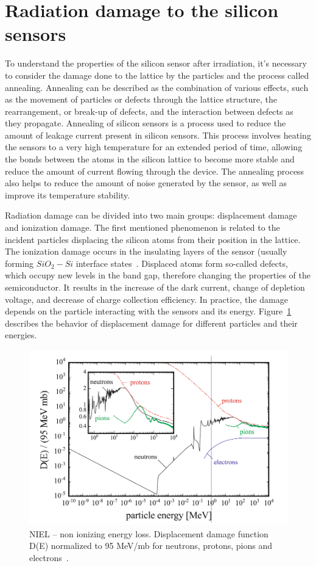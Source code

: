 \section{Radiation damage to the silicon sensors}
\label{silicon_damage}
To understand the properties of the silicon sensor after irradiation, it's necessary to consider the damage done to the lattice by the particles and the process called annealing. Annealing can be described as the combination of various effects, such as the movement of particles or defects through the lattice structure, the rearrangement, or break-up of defects, and the interaction between defects as they propagate. Annealing of silicon sensors is a process used to reduce the amount of leakage current present in silicon sensors. This process involves heating the sensors to a very high temperature for an extended period of time, allowing the bonds between the atoms in the silicon lattice to become more stable and reduce the amount of current flowing through the device. The annealing process also helps to reduce the amount of noise generated by the sensor, as well as improve its temperature stability. 

Radiation damage can be divided into two main groups: displacement damage and ionization damage. The first mentioned phenomenon is related to the incident particles displacing the silicon atoms from their position in the lattice. The ionization damage occurs in the insulating layers of the sensor (usually forming $SiO_{2}-Si$ interface states~\cite{Moll:1999kv}. Displaced atoms form so-called defects, which occupy new levels in the band gap, therefore changing the properties of the semiconductor. It results in the increase of the dark current, change of depletion voltage, and decrease of charge collection efficiency. In practice, the damage depends on the particle interacting with the sensors and its energy. Figure~\ref{fig_niel_si} describes the behavior of displacement damage for different particles and their energies.  
\begin{figure}[!h]
\centering
\includegraphics[width=0.75\columnwidth]{Chapter2/images/niel_silicons.png}
\caption{NIEL – non ionizing energy loss. Displacement damage function D(E) normalized to 95 MeV/mb for neutrons, protons, pions and electrons~\cite{Hartmann:2017gzy}.}
\label{fig_niel_si}
\end{figure}

